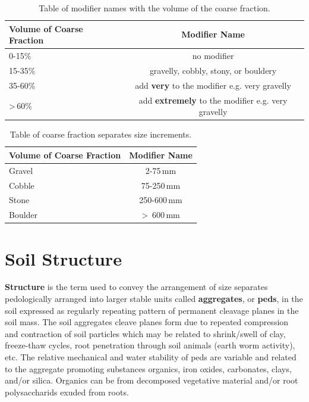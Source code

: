 \documentclass[a5paper]{report}
\begin{document}
\begin{table}[!htbp]
\label{tab:coarsefractionvolume}
\centering
\caption{Table of modifier names with the volume of the coarse fraction.}
\begin{tabular}{|l|c|}
\hline
Volume of Coarse Fraction           &  Modifier Name\\
\hline \hline
0-15\%      & no modifier\\
15-35\%     & gravelly, cobbly, stony, or bouldery\\
35-60\%     & add \textbf{very} to the modifier e.g. very gravelly\\
\textgreater\,60\%      & add \textbf{extremely} to the modifier e.g. very gravelly\\
\hline
\end{tabular}
\end{table}
    
\begin{table}[!htbp]
\label{tab:coarsefractionsizenames}
\centering
\caption{Table of coarse fraction separates size increments.}
\begin{tabular}{|l|c|}
\hline
Volume of Coarse Fraction           &  Modifier Name\\
\hline \hline
Gravel      & 2-75\,mm \\
Cobble      & 75-250\,mm \\
Stone       & 250-600\,mm \\
Boulder     & \textgreater\, 600\,mm \\
\hline
\end{tabular}
\end{table}
    
\section{Soil Structure}
\label{structure}
    
\textbf{Structure} is the term used to convey the arrangement of size separates pedologically arranged into larger stable units called \textbf{aggregates}, or \textbf{peds}, in the soil expressed as regularly repeating pattern of permanent cleavage planes in the soil mass. The soil aggregates cleave planes form due to repeated compression and contraction of soil particles which may be related to shrink/swell of clay, freeze-thaw cycles, root penetration through soil animals (earth worm activity), etc. The relative mechanical and water stability of peds are variable and related to the aggregate promoting substances organics, iron oxides, carbonates, clays, and/or silica. Organics can be from decomposed vegetative material and/or root polysaccharids exuded from roots.
    
\end{document}
